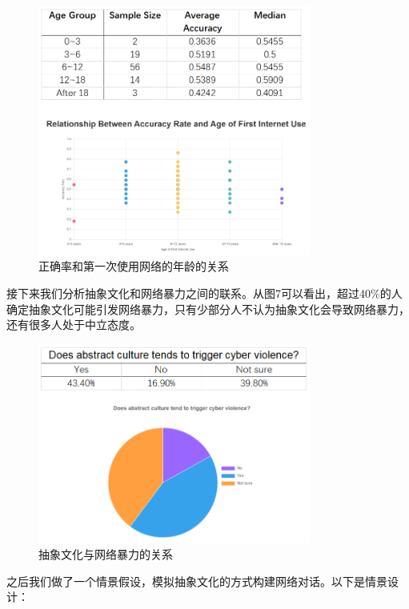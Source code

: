 \documentclass[12pt,a4paper]{ctexart}
\begin{document}
\begin{figure}[htbp]
    \centering
    \includegraphics[width=0.8\textwidth]{img/accuracy_vs_first_use_age.png}
    \caption{正确率和第一次使用网络的年龄的关系}
    \label{fig:accuracy_vs_first_use_age}
\end{figure}

接下来我们分析抽象文化和网络暴力之间的联系。从图7可以看出，超过40\%的人确定抽象文化可能引发网络暴力，只有少部分人不认为抽象文化会导致网络暴力，还有很多人处于中立态度。

\begin{figure}[htbp]
    \centering
    \includegraphics[width=0.8\textwidth]{img/abstract_vs_net_violence.png}
    \caption{抽象文化与网络暴力的关系}
    \label{fig:abstract_vs_net_violence}
\end{figure}

之后我们做了一个情景假设，模拟抽象文化的方式构建网络对话。以下是情景设计：
\end{document}
